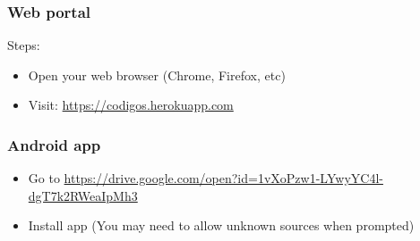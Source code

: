 \documentclass{article}
\begin{document}
\subsubsection{Web portal}
Steps:
\begin{itemize}
    \item Open your web browser (Chrome, Firefox, etc)
    \item Visit:  \url{https://codigos.herokuapp.com}
\end{itemize}
\subsubsection{Android app}
\begin{itemize}
    \item Go to \url{https://drive.google.com/open?id=1vXoPzw1-LYwyYC4l-dgT7k2RWeaIpMh3}
    \item Install app (You may need to allow unknown sources when prompted)
\end{itemize}
\end{document}
